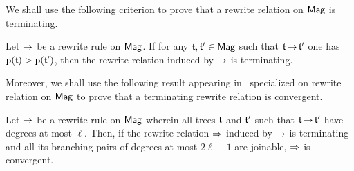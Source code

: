 We shall use the following criterion to prove that a rewrite relation on
$\mathsf{Mag}$ is terminating.
\medbreak

\begin{Lemma}\label{lem:prefix_word_termination}
    Let $\operatorname{\to}$ be a rewrite rule on $\mathsf{Mag}$. If for any
    $\mathfrak{t}, \mathfrak{t}' \in \mathsf{Mag}$ such that $\mathfrak{t} \operatorname{\to} \mathfrak{t}'$ one has
    $\mathrm{p}(\mathfrak{t}) > \mathrm{p}(\mathfrak{t}')$, then the rewrite relation
    induced by $\operatorname{\to}$ is terminating.
\end{Lemma}
\medbreak

Moreover, we shall use the following result appearing in~\cite{Gir16}
specialized on rewrite relation on $\mathsf{Mag}$ to prove that a terminating
rewrite relation is convergent.
\medbreak

\begin{Lemma} \label{lem:degree_confluence}
    Let $\operatorname{\to}$ be a rewrite rule on $\mathsf{Mag}$ wherein all trees $\mathfrak{t}$ and
    $\mathfrak{t}'$ such that $\mathfrak{t} \operatorname{\to} \mathfrak{t}'$ have degrees at most $\ell$.
    Then, if the rewrite relation $\operatorname{\Rightarrow}$ induced by $\operatorname{\to}$ is
    terminating and all its branching pairs of degrees at most
    $2\ell - 1$ are joinable, $\operatorname{\Rightarrow}$ is convergent.
\end{Lemma}
\medbreak
